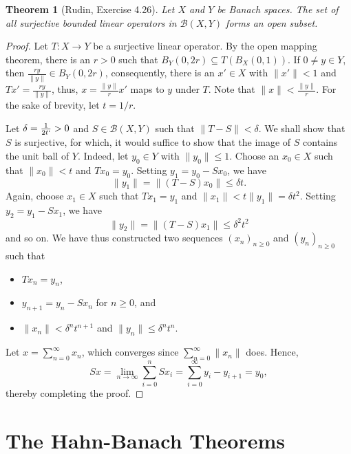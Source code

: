 \documentclass[11pt]{article}
\theoremstyle{thmstyle}
\newtheorem{theorem}{Theorem}[section]
\theoremstyle{defstyle}
\newcommand{\scrB}{\mathscr B}
\renewcommand{\le}{\leqslant}
\renewcommand{\ge}{\geqslant}
\begin{document}
\begin{theorem}[Rudin, Exercise 4.26]
    Let $X$ and $Y$ be Banach spaces. The set of all surjective bounded linear operators in $\scrB(X, Y)$ forms an open subset.
\end{theorem}
\begin{proof}
    Let $T: X\to Y$ be a surjective linear operator. By the open mapping theorem, there is an $r > 0$ such that $B_Y(0, 2r)\subseteq T\left(B_X(0, 1)\right)$. If $0\ne y\in Y$, then $\frac{ry}{\|y\|}\in B_Y(0, 2r)$, consequently, there is an $x'\in X$ with $\|x'\| < 1$ and $Tx' = \frac{ry}{\|y\|}$, thus, $x = \frac{\|y\|}{r}x'$ maps to $y$ under $T$. Note that $\|x\| < \frac{\|y\|}{r}$. For the sake of brevity, let $t = 1/r$.

    Let $\delta = \frac{1}{2t`} > 0$ and $S\in\scrB(X, Y)$ such that $\|T - S\| < \delta$. We shall show that $S$ is surjective, for which, it would suffice to show that the image of $S$ contains the unit ball of $Y$. Indeed, let $y_0\in Y$ with $\|y_0\|\le 1$. Choose an $x_0\in X$ such that $\|x_0\| < t$ and $Tx_0 = y_0$. Setting $y_1 = y_0 - Sx_0$, we have 
    \begin{equation*}
        \|y_1\| = \|(T - S)x_0\|\le\delta t.
    \end{equation*}
    Again, choose $x_1\in X$ such that $Tx_1 = y_1$ and $\|x_1\| < t\|y_1\| = \delta t^2$. Setting $y_2 = y_1 - Sx_1$, we have 
    \begin{equation*}
        \|y_2\| = \|(T - S)x_1\|\le \delta^2t^2
    \end{equation*}
    and so on. We have thus constructed two sequences $(x_n)_{n\ge 0}$ and $(y_n)_{n\ge 0}$ such that 
    \begin{itemize}
        \item $Tx_n = y_n$, 
        \item $y_{n + 1} = y_n - Sx_n$ for $n\ge 0$, and
        \item $\|x_n\| < \delta^n t^{n + 1}$ and $\|y_n\|\le\delta^n t^{n}$.
    \end{itemize}
    Let $x = \displaystyle\sum_{n = 0}^\infty x_n$, which converges since $\displaystyle\sum_{n = 0}^\infty \|x_n\|$ does. Hence, 
    \begin{equation*}
        Sx = \lim_{n\to\infty}\sum_{i = 0}^n Sx_i = \sum_{i = 0}^\infty y_i - y_{i + 1} = y_0,
    \end{equation*}
    thereby completing the proof.
\end{proof}

\section{The Hahn-Banach Theorems}
\end{document}
